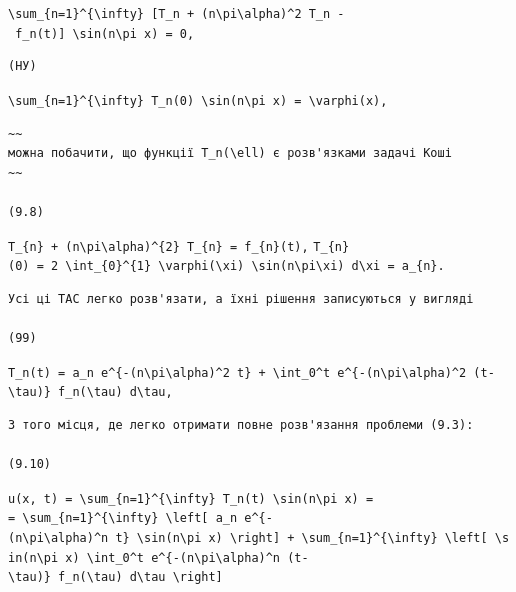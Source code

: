 \documentclass[
  ukrainian,
]{article}
\begin{document}
\texttt{\textbackslash{}sum\_\{n=1\}\^{}\{\textbackslash{}infty\}\ {[}T\textquotesingle{}\_n\ +\ (n\textbackslash{}pi\textbackslash{}alpha)\^{}2\ T\_n\ -\ f\_n(t){]}\ \textbackslash{}sin(n\textbackslash{}pi\ x)\ =\ 0,}

\begin{verbatim}
(НУ)
\end{verbatim}

\texttt{\textbackslash{}sum\_\{n=1\}\^{}\{\textbackslash{}infty\}\ T\_n(0)\ \textbackslash{}sin(n\textbackslash{}pi\ x)\ =\ \textbackslash{}varphi(x),}

\begin{verbatim}
~~
можна побачити, що функції T_n(\ell) є розв'язками задачі Коші
~~

(9.8)
\end{verbatim}

\texttt{T\_\{n\}\ +\ (n\textbackslash{}pi\textbackslash{}alpha)\^{}\{2\}\ T\_\{n\}\ =\ f\_\{n\}(t),}
\texttt{T\_\{n\}(0)\ =\ 2\ \textbackslash{}int\_\{0\}\^{}\{1\}\ \textbackslash{}varphi(\textbackslash{}xi)\ \textbackslash{}sin(n\textbackslash{}pi\textbackslash{}xi)\ d\textbackslash{}xi\ =\ a\_\{n\}.}

\begin{verbatim}
Усі ці TAC легко розв'язати, а їхні рішення записуються у вигляді

(99)
\end{verbatim}

\texttt{T\_n(t)\ =\ a\_n\ e\^{}\{-(n\textbackslash{}pi\textbackslash{}alpha)\^{}2\ t\}\ +\ \textbackslash{}int\_0\^{}t\ e\^{}\{-(n\textbackslash{}pi\textbackslash{}alpha)\^{}2\ (t-\textbackslash{}tau)\}\ f\_n(\textbackslash{}tau)\ d\textbackslash{}tau,}

\begin{verbatim}
З того місця, де легко отримати повне розв'язання проблеми (9.3):

(9.10)
\end{verbatim}

\texttt{u(x,\ t)\ =\ \textbackslash{}sum\_\{n=1\}\^{}\{\textbackslash{}infty\}\ T\_n(t)\ \textbackslash{}sin(n\textbackslash{}pi\ x)\ =}
\texttt{=\ \textbackslash{}sum\_\{n=1\}\^{}\{\textbackslash{}infty\}\ \textbackslash{}left{[}\ a\_n\ e\^{}\{-(n\textbackslash{}pi\textbackslash{}alpha)\^{}n\ t\}\ \textbackslash{}sin(n\textbackslash{}pi\ x)\ \textbackslash{}right{]}\ +\ \textbackslash{}sum\_\{n=1\}\^{}\{\textbackslash{}infty\}\ \textbackslash{}left{[}\ \textbackslash{}sin(n\textbackslash{}pi\ x)\ \textbackslash{}int\_0\^{}t\ e\^{}\{-(n\textbackslash{}pi\textbackslash{}alpha)\^{}n\ (t-\textbackslash{}tau)\}\ f\_n(\textbackslash{}tau)\ d\textbackslash{}tau\ \textbackslash{}right{]}}
\end{document}
